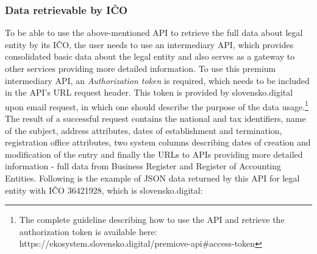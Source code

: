 \documentclass[thesis=B,english]{FITthesis}[2012/06/26]
\begin{document}
	\subsubsection{Data retrievable by IČO}
	To be able to use the above-mentioned API to retrieve the full data about legal entity by its IČO, the user needs to use an intermediary API, which provides consolidated basic data about the legal entity and also serves as a gateway to other services providing more detailed information. To use this premium intermediary API, an \textit{Authorization token} is required, which needs to be included in the API's URL request header. This token is provided by slovensko.digital upon email request, in which one should describe the purpose of the data usage.\footnote{ The complete guideline describing how to use the API and retrieve the authorization token is available here: https://ekosystem.slovensko.digital/premiove-api\#access-token} The result of a successful request contains the national and tax identifiers, name of the subject, address attributes, dates of establishment and termination, registration office attributes, two system columns describing dates of creation and modification of the entry and finally the URLs to APIs providing more detailed information - full data from Business Register and Register of Accounting Entities. Following is the example of JSON data returned by this API for legal entity with IČO 36421928, which is slovensko.digital:
\end{document}
